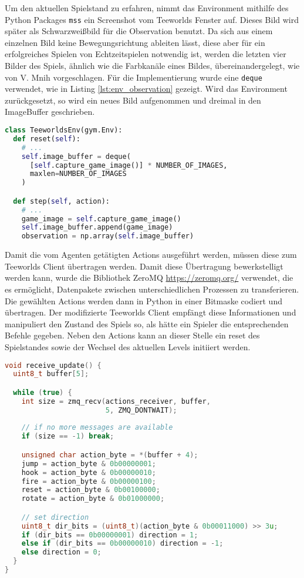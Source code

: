 \documentclass[11pt]{scrartcl}
\begin{document}
Um den aktuellen Spielstand zu erfahren, nimmt das Environment mithilfe des Python
Packages \lstinline!mss! ein Screenshot vom Teeworlds Fenster auf. Dieses Bild wird
später als Schwarzweißbild für die Observation benutzt. Da sich aus einem einzelnen Bild
keine Bewegungsrichtung ableiten lässt, diese aber für ein erfolgreiches Spielen von
Echtzeitspielen notwendig ist, werden die letzten vier Bilder des Spiels, ähnlich wie die
Farbkanäle eines Bildes, übereinandergelegt, wie von V. Mnih \cite[~S.5]{mnih2013playing}
vorgeschlagen. Für die Implementierung wurde eine \lstinline!deque! verwendet, wie in
Listing \ref{lst:env_observation} gezeigt. Wird das Environment zurückgesetzt, so wird
ein neues Bild aufgenommen und dreimal in den ImageBuffer geschrieben.
\begin{lstlisting}[language=Python, caption=Observation des Environments,
label=lst:env_observation]
class TeeworldsEnv(gym.Env):
  def reset(self):
    # ...
    self.image_buffer = deque(
      [self.capture_game_image()] * NUMBER_OF_IMAGES,
      maxlen=NUMBER_OF_IMAGES
    )

  def step(self, action):
    # ...
    game_image = self.capture_game_image()
    self.image_buffer.append(game_image)
    observation = np.array(self.image_buffer)
\end{lstlisting}
Damit die vom Agenten getätigten Actions ausgeführt werden, müssen diese zum Teeworlds Client
übertragen werden. Damit diese Übertragung bewerkstelligt werden kann, wurde die Bibliothek
ZeroMQ \url{https://zeromq.org/} verwendet, die es ermöglicht, Datenpakete zwischen
unterschiedlichen Prozessen zu transferieren. Die gewählten Actions werden dann in Python
in einer Bitmaske codiert und übertragen. Der modifizierte Teeworlds Client empfängt diese
Informationen und manipuliert den Zustand des Spiels so, als hätte ein Spieler die
entsprechenden Befehle gegeben. Neben den Actions kann an dieser Stelle ein reset des
Spielstandes sowie der Wechsel des aktuellen Levels initiiert werden.
\begin{lstlisting}[language=C++, caption=Empfangen der Actions im Teeworlds Client,
label=lst:teeclient_receive]
void receive_update() {
  uint8_t buffer[5];

  while (true) {
    int size = zmq_recv(actions_receiver, buffer,
                        5, ZMQ_DONTWAIT);
                        
    // if no more messages are available
    if (size == -1) break; 

    unsigned char action_byte = *(buffer + 4);
    jump = action_byte & 0b00000001;
    hook = action_byte & 0b00000010;
    fire = action_byte & 0b00000100;
    reset = action_byte & 0b00100000;
    rotate = action_byte & 0b01000000;

    // set direction
    uint8_t dir_bits = (uint8_t)(action_byte & 0b00011000) >> 3u;
    if (dir_bits == 0b00000001) direction = 1;
    else if (dir_bits == 0b00000010) direction = -1;
    else direction = 0;
  }
}
\end{lstlisting}
\end{document}
